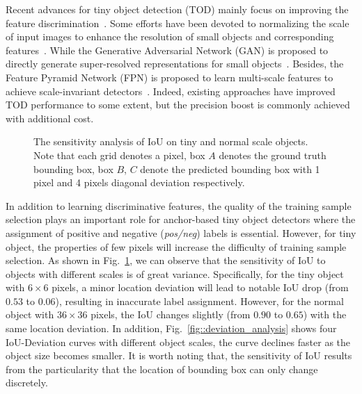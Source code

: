 \documentclass{article}
\newcommand{\fixedvskip}{-3mm}
\begin{document}
Recent advances for tiny object detection (TOD) mainly focus on improving the feature discrimination~\cite{FPN_2017_CVPR,M2Det_2019_AAAI,DetectoRS_2020_arXiv,PGAN_2017_CVPR,SOD-MTGAN_2018_ECCV,Better_to_Follow_2019_ICCV}. 
Some efforts have been devoted to normalizing the scale of input images to enhance the resolution of small objects and corresponding features~\cite{SNIP_2018_CVPR,SNIPER_2018_NIPS}. While the Generative Adversarial Network (GAN) is proposed to directly generate super-resolved representations for small objects~\cite{PGAN_2017_CVPR,SOD-MTGAN_2018_ECCV,Better_to_Follow_2019_ICCV}. 
Besides, the Feature Pyramid Network (FPN) is proposed to learn multi-scale features to achieve scale-invariant detectors~\cite{FPN_2017_CVPR,M2Det_2019_AAAI,DetectoRS_2020_arXiv}. Indeed, existing approaches have improved TOD performance to some extent, but the precision boost is commonly achieved with additional cost.

 \begin{figure}[t]
    \centering
    \vspace{\fixedvskip}
    \label{fig:tiny_analysis}
    \caption{The sensitivity analysis of IoU on tiny and normal scale objects. Note that each grid denotes a pixel, box $A$ denotes the ground truth bounding box, box $B$, $C$ denote the predicted bounding box with 1 pixel and 4 pixels diagonal deviation respectively.}
    \vspace{\fixedvskip}
\end{figure}

In addition to learning discriminative features, the quality of the training sample selection plays an important role for anchor-based tiny object detectors \cite{atss_2020_cvpr} where the assignment of positive and negative (\textit{pos/neg}) labels is essential. However, for tiny object, the properties of few pixels will increase the difficulty of training sample selection. As shown in Fig.~\ref{fig:tiny_analysis}, we can observe that the sensitivity of IoU to objects with different scales is of great variance. Specifically, for the tiny object with $6\times 6$ pixels, a minor location deviation will lead to notable IoU drop (from $0.53$ to $0.06$), resulting in inaccurate label assignment. However, for the normal object with $36\times 36$ pixels, the IoU changes slightly (from $0.90$ to $0.65$) with the same location deviation. In addition, Fig.~\ref{fig::deviation_analysis} shows four IoU-Deviation curves with different object scales, the curve declines faster as the object size becomes smaller. It is worth noting that, the sensitivity of IoU results from the particularity that the location of bounding box can only change discretely. 
\end{document}
